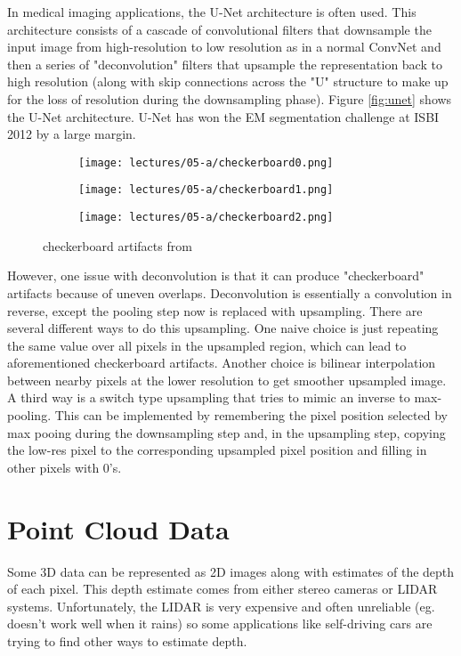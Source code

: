 In medical imaging applications, the U-Net architecture is often used. This architecture consists of a cascade of convolutional filters that downsample the input image from high-resolution to low resolution as in a normal ConvNet and then a series of "deconvolution" filters that upsample the representation back to high resolution (along with skip connections across the "U" structure to make up for the loss of resolution during the downsampling phase). Figure \ref{fig:unet} shows the U-Net architecture. U-Net has won the EM segmentation challenge at ISBI 2012 by a large margin.

\begin{figure}[ht]
    \centering
    \begin{subfigure}{0.25\textwidth}
    \texttt{[image: lectures/05-a/checkerboard0.png]} 
    \end{subfigure}
    \begin{subfigure}{0.25\textwidth}
    \texttt{[image: lectures/05-a/checkerboard1.png]}
    \end{subfigure}
    \begin{subfigure}{0.25\textwidth}
    \texttt{[image: lectures/05-a/checkerboard2.png]}
    \end{subfigure}
    \caption{checkerboard artifacts from \citep{odena2016deconvolution}}
    \label{fig:checkerboard}
\end{figure}

However, one issue with deconvolution is that it can produce "checkerboard" artifacts because of uneven overlaps. Deconvolution is essentially a convolution in reverse, except the pooling step now is replaced with upsampling. There are several different ways to do this upsampling. One naive choice is just repeating the same value over all pixels in the upsampled region, which can lead to aforementioned checkerboard artifacts. Another choice is bilinear interpolation between nearby pixels at the lower resolution to get smoother upsampled image. A third way is a switch type upsampling that tries to mimic an inverse to max-pooling. This can be implemented by remembering the pixel position selected by max pooing during the downsampling step and, in the upsampling step, copying the low-res pixel to the corresponding upsampled pixel position and filling in other pixels with 0's.
\section{Point Cloud Data}
Some 3D data can be represented as 2D images along with estimates of the depth of each pixel. This depth estimate comes from either stereo cameras or LIDAR systems. Unfortunately, the LIDAR is very expensive and often unreliable (eg. doesn't work well when it rains) so some applications like self-driving cars are trying to find other ways to estimate depth.


